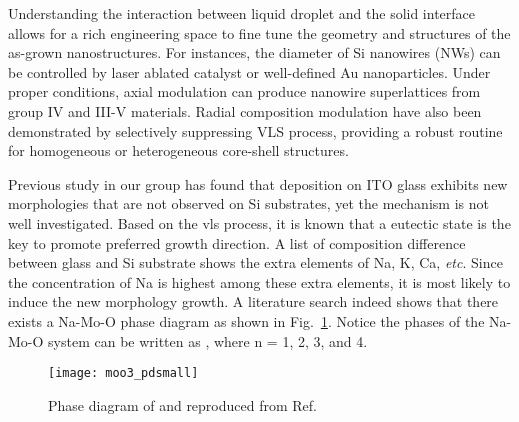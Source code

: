 Understanding the interaction between liquid droplet and the solid interface allows for a rich engineering space to fine tune the geometry and structures of the as-grown nanostructures. For instances, the diameter of Si nanowires (NWs) can be controlled by laser ablated catalyst\cite{Morales1998} or well-defined Au nanoparticles.\cite{Cui2001b} Under proper conditions, axial modulation can produce nanowire superlattices from group IV and III-V materials.\citep{Gudiksen2002,Bjork2002}  Radial composition modulation have also been demonstrated by selectively suppressing VLS process, providing a robust routine for homogeneous or heterogeneous core-shell structures.\cite{Lauhon2002a}  

Previous study in our group has found that  deposition on ITO glass exhibits new morphologies that are not observed on Si substrates, yet the mechanism is not well investigated.\cite{predeep2011} Based on the \gls{vls} process, it is known that a eutectic state is the key to promote preferred growth direction. A list of composition difference between glass and Si substrate shows the extra elements of Na, K, Ca, \emph{etc}. Since the concentration of Na is highest among these extra elements, it is most likely to induce the new morphology growth. A literature search indeed shows that there exists a Na-Mo-O phase diagram as shown in Fig.~\ref{fig:ch4pd}.\cite{Hoermann1929} Notice the phases of the Na-Mo-O system can be written as , where n = 1, 2, 3, and 4. 

\begin{figure}[htb]
\centering
\texttt{[image: moo3\_pdsmall]}
\caption[Phase diagram of  and ]{Phase diagram of  and  reproduced from Ref.~\cite{Hoermann1929}}
\label{fig:ch4pd}
\end{figure}

